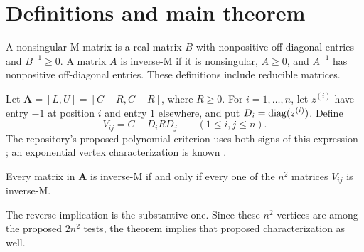 

\begin{abstract}
An interval matrix consists entirely of inverse-M matrices if and only if $n^2$ specified vertices are inverse-M matrices. This proves the proposed $2n^2$-vertex criterion and shows that half of those tests are unnecessary. The proof combines induction on principal submatrices, monotonicity of two-index Schur complements, and an adjugate lemma that rules out singularity without assuming regularity in advance. Zero entries, zero interval widths, and reducible matrices are allowed.
\end{abstract}
\section{Definitions and main theorem}
A nonsingular M-matrix is a real matrix $B$ with nonpositive off-diagonal entries and $B^{-1}\ge0$. A matrix $A$ is inverse-M if it is nonsingular, $A\ge0$, and $A^{-1}$ has nonpositive off-diagonal entries. These definitions include reducible matrices.

Let $\boldsymbol A=[L,U]=[C-R,C+R]$, where $R\ge0$. For $i=1,\ldots,n$, let $z^{(i)}$ have entry $-1$ at position $i$ and entry $1$ elsewhere, and put $D_i=\operatorname{diag}(z^{(i)})$. Define
\[
 V_{ij}=C-D_iRD_j\qquad(1\le i,j\le n).
\]
The repository's proposed polynomial criterion uses both signs of this expression \cite{repo,overview}; an exponential vertex characterization is known \cite{intervalproperty}.
\begin{theorem}\label{thm:main}
Every matrix in $\boldsymbol A$ is inverse-M if and only if every one of the $n^2$ matrices $V_{ij}$ is inverse-M.
\end{theorem}
The reverse implication is the substantive one. Since these $n^2$ vertices are among the proposed $2n^2$ tests, the theorem implies that proposed characterization as well.
